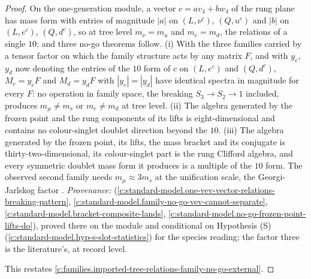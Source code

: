 \documentclass[11pt]{article}
\theoremstyle{definition}
\theoremstyle{plain}
\begin{document}
\begin{proof}
On the one-generation module, a vector $c = a v_{4} + b w_{4}$ of the rung plane has mass form with entries of magnitude $|a|$ on $(L, \nu^{c})$, $(Q, u^{c})$ and $|b|$ on $(L, e^{c})$, $(Q, d^{c})$, so at tree level $m_{\nu} = m_{u}$ and $m_{e} = m_{d}$, the relations of a single $10$; and three no-go theorems follow. (i) With the three families carried by a tensor factor on which the family structure acts by any matrix $F$, and with $y_{e}$, $y_{d}$ now denoting the entries of the $10$ form of $c$ on $(L, e^{c})$ and $(Q, d^{c})$, $M_{e} = y_{e}F$ and $M_{d} = y_{d}F$ with $|y_{e}| = |y_{d}|$ have identical spectra in magnitude for every $F$: no operation in family space, the breaking $S_{3} \to S_{2} \to 1$ included, produces $m_{\mu} \neq m_{s}$ or $m_{e} \neq m_{d}$ at tree level. (ii) The algebra generated by the frozen point and the rung components of its lifts is eight-dimensional and contains no colour-singlet doublet direction beyond the $10$. (iii) The algebra generated by the frozen point, its lifts, the mass bracket and its conjugate is thirty-two-dimensional, its colour-singlet part is the rung Clifford algebra, and every symmetric doublet mass form it produces is a multiple of the $10$ form. The observed second family needs $m_{\mu} \approx 3 m_{s}$ at the unification scale, the Georgi-Jarlskog factor \cite{GeorgiJarlskog1979}. \emph{Provenance:} \cite[Cor.~9.25, Thms.~9.31, 9.33, 9.35]{ButlerT12} (\ref{c:standard-model.one-vev-vector-relations-breaking-pattern}, \ref{c:standard-model.family-no-go-vev-cannot-separate}, \ref{c:standard-model.bracket-composite-lands}, \ref{c:standard-model.no-go-frozen-point-lifts-do}), proved there on the module and conditional on Hypothesis (S) (\ref{c:standard-model.hyp-s-slot-statistics}) for the species reading; the factor three is the literature's, at record level.

This restates \ref{c:families.imported-tree-relations-family-no-go-external}.

\end{proof}
\end{document}
